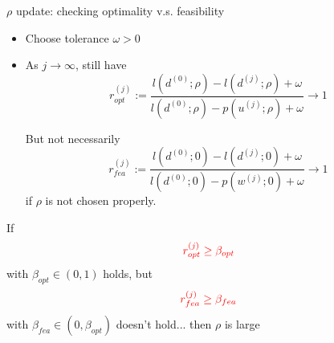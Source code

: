 \documentclass[8pt]{beamer}
\begin{document}
	\begin{frame}{$\rho$ update: checking optimality v.s. feasibility}
		\begin{itemize}
			\item   Choose tolerance $\omega>0$
			\item  As $j\to \infty$, still have 
				$$r^{(j)}_{opt} := \frac{l(d^{(0)};\rho) - l (d^{(j)};\rho) + \omega  }{l(d^{(0)}; \rho) - p (u^{(j)};\rho) + \omega } \to 1 $$

				But not necessarily 
				\[
					r^{(j)}_{fea} := \frac{l(d^{(0)};0) - l (d^{(j)};0) + \omega}{l(d^{(0)}; 0)- p(w^{(j)};0) + \omega}  \to 1
				\]
				if $\rho$ is not chosen properly. 
		\end{itemize}
		\vfill 
		If
		\[ {\color{red} r^{(j)}_{opt}  \ge \beta_{opt}} \]
		with $\beta_{opt} \in (0,1)$ holds, but  
		\[ {\color{red} r^{(j)}_{fea} \ge \beta_{fea} } \]
		with $\beta_{fea}    \in (0,\beta_{opt} )$ doesn't hold... then $\rho$ is large
		\vfill
	\end{frame}

\end{document}
